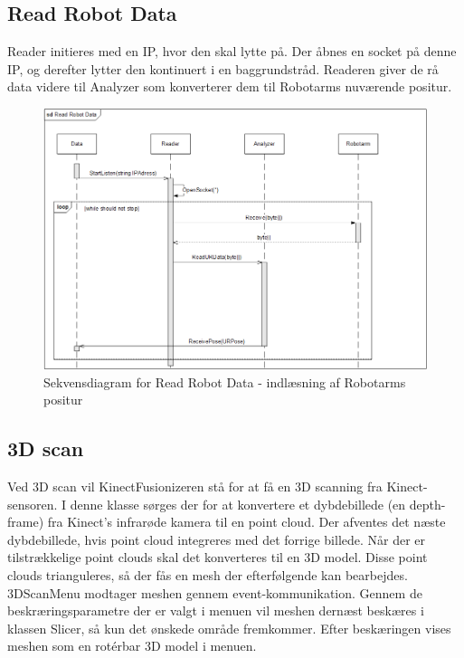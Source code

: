 \subsection{Read Robot Data} 
Reader initieres med en IP, hvor den skal lytte på. 
Der åbnes en socket på denne IP, og derefter lytter den kontinuert i en baggrundstråd. 
Readeren giver de rå data videre til Analyzer som konverterer dem til Robotarms nuværende positur.

\begin{figure}[H]
    \centering
    \includegraphics[width=1\textwidth]{figurer/d/Design/Sequence/sd_reading}
    \caption{Sekvensdiagram for Read Robot Data - indlæsning af Robotarms positur}
    \label{sd_reading}
\end{figure}

\subsection{3D scan}
Ved 3D scan vil KinectFusionizeren stå for at få en 3D scanning fra Kinect-sensoren. I denne klasse sørges der for at konvertere et dybdebillede (en depth-frame) fra Kinect's infrarøde kamera til en point cloud. Der afventes det næste dybdebillede, hvis point cloud integreres med det forrige billede. Når der er tilstrækkelige point clouds skal det konverteres til en 3D model.  Disse point clouds trianguleres, så der fås en mesh der efterfølgende kan bearbejdes. 3DScanMenu modtager meshen gennem event-kommunikation.
Gennem de beskræringsparametre der er valgt i menuen vil meshen dernæst beskæres i klassen Slicer, så kun det ønskede område fremkommer. Efter beskæringen vises meshen som en rotérbar 3D model i menuen.

